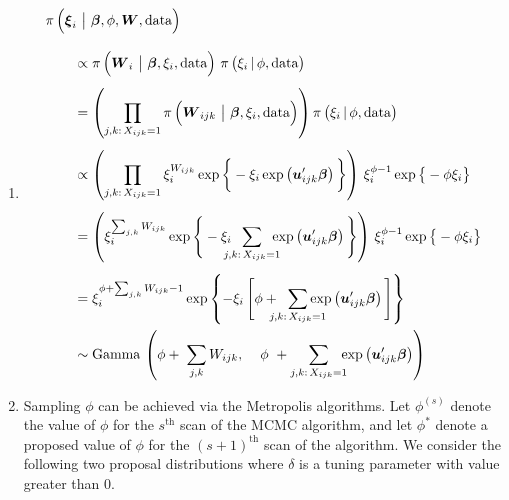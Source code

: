 \documentclass[11pt]{article}
\renewcommand{\vec}{\boldsymbol}
\newcommand{\barS}{\,|\,}
\newcommand{\barM}{~\big|~}
\begin{document}
\begin{enumerate}[label=Step \arabic*., leftmargin=13mm, itemsep=10mm]

\item 
\begin{align*} \MoveEqLeft
\pi\, \Big( \vec{\xi}_i \barM \vec{\beta}, \phi, \vec{W}, \text{data} \Big) \\[2ex]
&\propto \pi\,\Big( \vec{W}_i \barM \vec{\beta}, \xi_i, \text{data} \Big)~ \pi\, \big( \xi_i \barS \phi, \text{data} \big) \\[1ex]
&= \left( \prod_{j,k{:}\, X_{ijk}=1} \pi\,\Big( \vec{W}_{ijk} \barM \vec{\beta}, \xi_i, \text{data} \Big) \right) \pi\, \big( \xi_i \barS \phi, \text{data} \big) \\[1ex]
&\propto \left( \prod_{j,k{:}\, X_{ijk}=1} \xi_i^{W_{ijk}} \exp\bigg\{ -\xi_i \exp\left( \vec{u}_{ijk}^\prime \vec{\beta} \right) \bigg\} \right)\, \xi_i^{\phi - 1} \exp\big\{ -\phi \xi_i \big\} \\[1ex]
&= \left( \xi_i^{\sum_{j,k} W_{ijk}} \exp\Bigg\{ -\xi_i \hspace{2mm} \sum_{\mathclap{ j,k{:}\, X_{ijk}=1 }} \hspace{2mm} \exp\left( \vec{u}_{ijk}^\prime \vec{\beta} \right) \Bigg\} \right)\, \xi_i^{\phi - 1} \exp\big\{ -\phi \xi_i \big\} \\[1ex]
&= \xi_i^{ \phi + \sum_{j,k} W_{ijk} - 1 } \exp\left\{ -\xi_i\, \Bigg[ \phi + \hspace{2mm} \sum_{\mathclap{ j,k{:}\, X_{ijk}=1 }} \exp\left( \vec{u}_{ijk}^\prime \vec{\beta} \right) \Bigg] \right\} \\
& \sim \text{Gamma}\,\left(\phi + \hspace{1mm} \sum_{j,k} W_{ijk}, \hspace{4mm} \phi~ +  \sum_{j,k{:}\, X_{ijk}=1 }\hspace{-2mm} \exp\left( \vec{u}_{ijk}^\prime \vec{\beta} \right) \right)
\end{align*}






\item Sampling $\phi$ can be achieved via the Metropolis algorithms.  Let $\phi^{(s)}$ denote the value of $\phi$ for the $s^{\text{th}}$ scan of the MCMC algorithm, and let $\phi^*$ denote a proposed value of $\phi$ for the $(s+1)^{\text{th}}$ scan of the algorithm.  We consider the following two proposal distributions where $\delta$ is a tuning parameter with value greater than 0. \vspace{2mm}


\end{enumerate}
\end{document}
